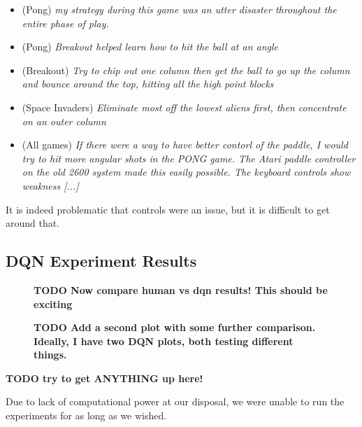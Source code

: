 \documentclass[letterpaper, 10 pt, conference]{ieeeconf}  %
\begin{document}
\begin{itemize}
    \item (Pong) \emph{my strategy during this game was an utter disaster throughout the entire
    phase of play.}
    \item (Pong) \emph{Breakout helped learn how to hit the ball at an angle}
    \item (Breakout) \emph{Try to chip out one column then get the ball to go up the column and
    bounce around the top, hitting all the high point blocks}
    \item (Space Invaders) \emph{Eliminate most off the lowest aliens first, then concentrate on an
    outer column}
    \item (All games) \emph{If there were a way to have better contorl of the paddle, I would try to
    hit more angular shots in the PONG game. The Atari paddle controller on the old 2600 system made
    this easily possible. The keyboard controls show weakness [...]}
\end{itemize}

It is indeed problematic that controls were an issue, but it is difficult to get around that.

\subsection{DQN Experiment Results}\label{ssec:dqn_results}

\begin{figure}[t]
\begin{center}
\fbox{\rule[-.5cm]{0cm}{4cm} \rule[-.5cm]{4cm}{0cm}}
\end{center}
\caption{\textbf{TODO Now compare human vs dqn results! This should be exciting}}
\label{fig:dqn_1}
\end{figure}

\begin{figure}[t]
\begin{center}
\fbox{\rule[-.5cm]{0cm}{4cm} \rule[-.5cm]{4cm}{0cm}}
\end{center}
\caption{\textbf{TODO Add a second plot with some further comparison. Ideally, I have two DQN plots,
both testing different things.}}
\label{fig:dqn_2}
\end{figure}

\textbf{TODO try to get ANYTHING up here!}

Due to lack of computational power at our disposal, we were unable to run the experiments for as
long as we wished.
\end{document}
